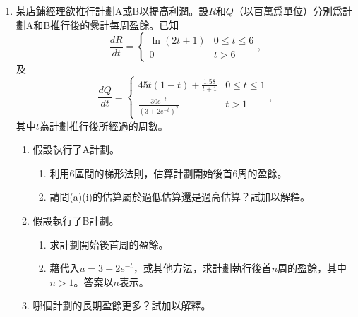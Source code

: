\documentclass[12pt]{article}
\begin{document}
\begin{enumerate}
        \item 某店鋪經理欲推行計劃A或B以提高利潤。設$R$和$Q$（以百萬爲單位）分別爲計劃A和B推行後的纍計每周盈餘。已知\[\frac{dR}{dt}=\begin{cases}
            \ln(2t+1)&0\leq t\leq 6\\
            0&t>6
        \end{cases},\]及\[\frac{dQ}{dt}=\begin{cases}
            45t(1-t)+\frac{1.58}{t+1}&0\leq t\leq 1\\
            \frac{30e^{-t}}{(3+2e^{-t})^2}&t>1
        \end{cases},\]其中$t$為計劃推行後所經過的周數。\begin{enumerate}
            \item 假設執行了A計劃。\begin{enumerate}
                \item 利用6區間的梯形法則，估算計劃開始後首6周的盈餘。
                \item 請問(a)(i)的估算屬於過低估算還是過高估算？試加以解釋。
            \end{enumerate}
            \item 假設執行了B計劃。\begin{enumerate}
                \item 求計劃開始後首周的盈餘。
                \item 藉代入$u=3+2e^{-t}$，或其他方法，求計劃執行後首$n$周的盈餘，其中$n>1$。答案以$n$表示。
            \end{enumerate}
            \item 哪個計劃的長期盈餘更多？試加以解釋。
        \end{enumerate}
    \end{enumerate}
\end{document}
